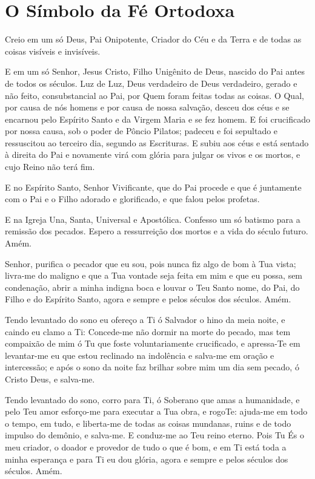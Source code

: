 \documentclass{subfiles}
\begin{document}
\section*{O Símbolo da Fé Ortodoxa}

Creio em um só Deus, Pai Onipotente, Criador do Céu e da Terra e de
todas as coisas visíveis e invisíveis.

E em um só Senhor, Jesus Cristo, Filho Unigênito de Deus, nascido do Pai antes
de todos os séculos. Luz de Luz, Deus verdadeiro de Deus verdadeiro, gerado e
não feito, consubstancial ao Pai, por Quem foram feitas todas as coisas. O Qual,
por causa de nós homens e por causa de nossa salvação, desceu dos céus e se
encarnou pelo Espírito Santo e da Virgem Maria e se fez homem. E foi crucificado
por nossa causa, sob o poder de Pôncio Pilatos; padeceu e foi sepultado e
ressuscitou ao terceiro dia, segundo as Escrituras. E subiu aos céus e está
sentado à direita do Pai e novamente virá com glória para julgar os vivos e os
mortos, e cujo Reino não terá fim.

E no Espírito Santo, Senhor Vivificante, que do Pai procede e que é
juntamente com o Pai e o Filho adorado e glorificado, e que falou pelos
profetas.

E na Igreja Una, Santa, Universal e Apostólica. Confesso um só
batismo para a remissão dos pecados. Espero a ressurreição dos mortos e a
vida do século futuro. Amém.


Senhor, purifica o pecador que eu sou, pois nunca fiz algo de bom à Tua vista;
livra-me do maligno e que a Tua vontade seja feita em mim e que eu possa, sem
condenação, abrir a minha indigna boca e louvar o Teu Santo nome, do Pai, do
Filho e do Espírito Santo, agora e sempre e pelos séculos dos séculos. Amém.


Tendo levantado do sono eu ofereço a Ti ó Salvador o hino da meia noite, e
caindo eu clamo a Ti: Concede-me não dormir na morte do pecado, mas tem
compaixão de mim ó Tu que foste voluntariamente crucificado, e apressa-Te em
levantar-me eu que estou reclinado na indolência e salva-me em oração e
intercessão; e após o sono da noite faz brilhar sobre mim um dia sem pecado, ó
Cristo Deus, e salva-me.


Tendo levantado do sono, corro para Ti, ó Soberano que amas a humanidade, e pelo
Teu amor esforço-me para executar a Tua obra, e rogoTe: ajuda-me em todo o
tempo, em tudo, e liberta-me de todas as coisas mundanas, ruins e de todo
impulso do demônio, e salva-me. E conduz-me ao Teu reino eterno. Pois Tu És o
meu criador, o doador e provedor de tudo o que é bom, e em Ti está toda a minha
esperança e para Ti eu dou glória, agora e sempre e pelos séculos dos séculos.
Amém.
\end{document}
